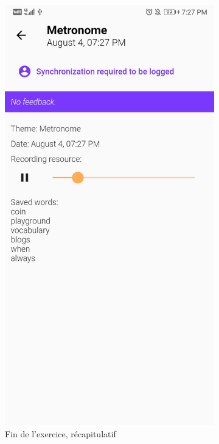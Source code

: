 \begin{appendices}
\begin{landscape}
\begin{figure}[h]
\begin{subfigure}{.25\textwidth}
    \includegraphics[width=.75\linewidth]{content/imgs/screen6.jpg}
    \caption{Fin de l'exercice, récapitulatif}
    \label{appendix:screen_progress1}
  \end{subfigure}%
  \begin{subfigure}{.25\textwidth}
    \centering

\end{subfigure}
\end{figure}
\end{landscape}
\end{appendices}
